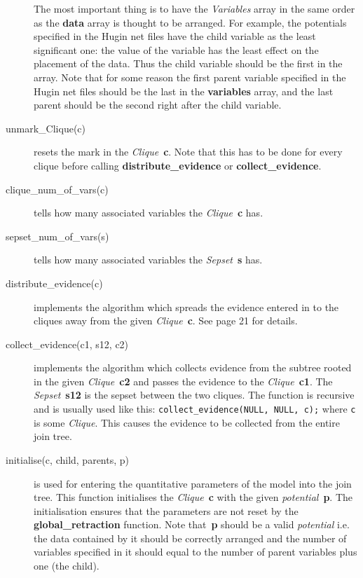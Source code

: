 \documentclass[12pt,a4paper]{report}
\begin{document}
\begin{description}
The most important thing is to have the {\it Variables} array in the 
same order as the \textbf{data} array is thought to be arranged. 
For example, the potentials specified in the Hugin net files have the 
child variable as the least significant one: the value of the variable 
has the least effect on the placement of the data. Thus the child
variable should be the first in the array. Note that for some reason 
the first parent variable specified in the Hugin net files should be 
the last in the \textbf{variables} array, and the last parent should
be the second right after the child variable.
\item[unmark\_Clique(c)] resets the mark in the {\it
Clique}~\textbf{c}. Note that this has to be done for every clique 
before calling \textbf{distribute\_evidence} or 
\textbf{collect\_evidence}.
\item[clique\_num\_of\_vars(c)] tells how many associated variables the 
{\it Clique}~\textbf{c} has.
\item[sepset\_num\_of\_vars(s)] tells how many associated variables the 
{\it Sepset}~\textbf{s} has.
\item[distribute\_evidence(c)] implements the algorithm which spreads 
the evidence entered in to the cliques away from the given 
{\it Clique}~\textbf{c}. See \cite{procedural_guide} page 21 for
details. 
\item[collect\_evidence(c1, s12, c2)] implements the algorithm which 
collects evidence from the subtree rooted in the given {\it
Clique}~\textbf{c2} and passes the evidence to the {\it
Clique}~\textbf{c1}. The {\it Sepset}~\textbf{s12} is the sepset
between the two cliques. The function is recursive and is usually
used like this: \verb+collect_evidence(NULL, NULL, c);+ where \verb+c+
is some {\it Clique}. This causes the evidence to be collected from
the entire join tree.
\item[initialise(c, child, parents, p)] is used for entering the
quantitative parameters of the model into the join tree. This function
initialises the {\it Clique}~\textbf{c} with the given {\it
potential}~\textbf{p}. The initialisation ensures that the parameters
are not reset by the \textbf{global\_retraction} function. Note
that~\textbf{p} should be a valid {\it potential} i.e. the data
contained by it should be correctly arranged and the number of
variables specified in it should equal to the number of parent
variables plus one (the child).


\end{description}
\end{document}
